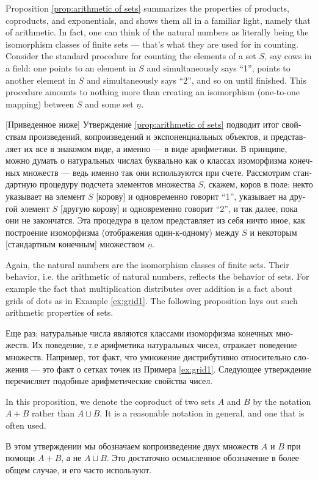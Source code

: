 \documentclass[a4paper]{book}
\def\ul{\underline}
\theoremstyle{myth}
\begin{document}
\begin{russian}
Proposition \ref{prop:arithmetic of sets} summarizes the properties of products, coproducts, and exponentials, and shows them all in a familiar light, namely that of arithmetic. In fact, one can think of the natural numbers as literally being the isomorphism classes of finite sets — that's what they are used for in counting. Consider the standard procedure for counting the elements of a set $S$, say cows in a field: one points to an element in $S$ and simultaneously says “1”, points to another element in $S$ and simultaneously says “2”, and so on until finished. This procedure amounts to nothing more than creating an isomorphism (one-to-one mapping) between $S$ and some set $\ul{n}$. 

[Приведенное ниже] Утверждение \ref{prop:arithmetic of sets} подводит итог свойствам произведений, копроизведений и экспоненциальных объектов, и представляет их все в знакомом виде, а именно — в виде арифметики. В принципе, можно думать о натуральных числах буквально как о классах изоморфизма конечных множеств — ведь именно так они используются при счете. Рассмотрим стандартную процедуру подсчета элементов множества $S$, скажем, коров в поле: некто указывает на элемент $S$ [корову] и одновременно говорит “1”, указывает на другой элемент $S$ [другую корову] и одновременно говорит “2”, и так далее, пока они не закончатся. Эта процедура в целом представляет из себя ничто иное, как построение изоморфизма (отображения один-к-одному) между $S$ и некоторым [стандартным конечным] множеством $\ul{n}$. 

Again, the natural numbers are the isomorphism classes of finite sets. Their behavior, i.e. the arithmetic of natural numbers, reflects the behavior of sets. For example the fact that multiplication distributes over addition is a fact about grids of dots as in Example \ref{ex:grid1}. The following proposition lays out such arithmetic properties of sets.

Еще раз: натуральные числа являются классами изоморфизма конечных множеств. Их поведение, т.е арифметика натуральных чисел, отражает поведение множеств. Например, тот факт, что умножение дистрибутивно относительно сложения — это факт о сетках точек из Примера \ref{ex:grid1}. Следующее утверждение перечисляет подобные арифметические свойства чисел.

In this proposition, we denote the coproduct of two sets $A$ and $B$ by the notation $A+B$ rather than $A\sqcup B$. It is a reasonable notation in general, and one that is often used. 

В этом утверждении мы обозначаем копроизведение двух множеств $A$ и $B$ при помощи $A+B$, а не $A\sqcup B$. Это достаточно осмысленное обозначение в более общем случае, и его часто используют. 


\end{russian}
\end{document}
